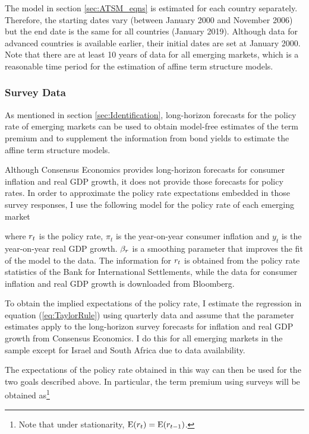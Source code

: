 The model in section \ref{sec:ATSM_eqns} is estimated for each country separately. Therefore, the starting dates vary (between January 2000 and November 2006) but the end date is the same for all countries (January 2019). Although data for advanced countries is available earlier, their initial dates are set at January 2000. Note that there are at least 10 years of data for all emerging markets, which is a reasonable time period for the estimation of affine term structure models.
%	

\subsubsection{Survey Data} \label{sec:SurveyData}
As mentioned in section \ref{sec:Identification}, long-horizon forecasts for the policy rate of emerging markets can be used to obtain model-free estimates of the term premium and to supplement the information from bond yields to estimate the affine term structure models.

Although Consensus Economics provides long-horizon forecasts for consumer inflation and real GDP growth, it does not provide those forecasts for policy rates. In order to approximate the policy rate expectations embedded in those survey responses, I use the following model for the policy rate of each emerging market
	

where $r_{t}$ is the policy rate, $\pi_{t}$ is the year-on-year consumer inflation and $y_{t}$ is the year-on-year real GDP growth. $\beta_{r}$ is a smoothing parameter that improves the fit of the model to the data. The information for $r_{t}$ is obtained from the policy rate statistics of the Bank for International Settlements, while the data for consumer inflation and real GDP growth is downloaded from Bloomberg.

To obtain the implied expectations of the policy rate, I estimate the regression in equation (\ref{eq:TaylorRule}) using quarterly data and assume that the parameter estimates apply to the long-horizon survey forecasts for inflation and real GDP growth from Consensus Economics. I do this for all emerging markets in the sample except for Israel and South Africa due to data availability.

The expectations of the policy rate obtained in this way can then be used for the two goals described above. In particular, the term premium using surveys will be obtained as\footnote{Note that under stationarity, $\mathrm{E}(r_{t}) = \mathrm{E}(r_{t-1})$.}
	


